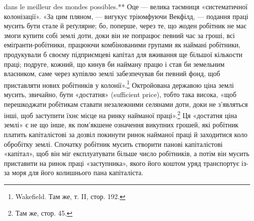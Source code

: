 dans le meilleur des mondes possibles.** Оце — велика таємниця «систематичної колонізації». «За цим
пляном, — вигукує тріюмфуючи Векфілд, —
подання праці мусить бути стале й реґулярне; бо, поперше, через те, що жоден робітник не має змоги
купити собі землі доти, доки він не попрацює певний час за гроші, всі еміґранти-робітники, працюючи
комбінованими групами як наймані робітники, продукували б своєму підприємцеві капітал для вживання
ще більшої кількости праці; подруге, кожний, що кинув би найману працю і став би земельним
власником, саме через купівлю землі забезпечував би певний фонд, щоб приставляти
нових робітників у колонії».\footnote{
Wakefield. Там же, т. II, стор. 192.
} Октройована державою ціна землі мусить, звичайно, бути
«достатня» (sufficient price), тобто така висока, «щоб перешкоджати робітикам ставати незалежними
селянами доти, доки не з’являться інші, щоб заступити їхнє місце на ринку найманої праці».\footnote{
Там же, стор. 45.
} Ця
«достатня ціна землі» є не що інше, як пом’якшене означення викупних грошей, які робітник платить
капіталістові за дозвіл покинути ринок найманої праці й заходитися коло обробітку землі. Спочатку
робітник мусить створити панові капіталістові «капітал», щоб він міг експлуатувати більше число
робітників, а потім він мусить приставити на ринок праці «заступника», якого його коштом уряд
транспортує із-за моря для його колишнього пана капіталіста.

